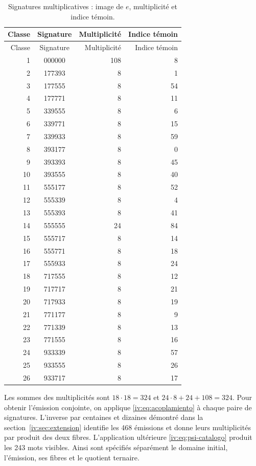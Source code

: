 \begin{longtable}{rcrr}
\caption{Signatures multiplicatives : image de \(e\), multiplicité et indice témoin.}
\label{iv:iv:tabla-firmas-multiplicativas}\\
\toprule
Classe & Signature & Multiplicité & Indice témoin\\
\midrule
\endfirsthead
\toprule
Classe & Signature & Multiplicité & Indice témoin\\
\midrule
\endhead
1&000000&108&8\\
2&177393&8&1\\
3&177555&8&54\\
4&177771&8&11\\
5&339555&8&6\\
6&339771&8&15\\
7&339933&8&59\\
8&393177&8&0\\
9&393393&8&45\\
10&393555&8&40\\
11&555177&8&52\\
12&555339&8&4\\
13&555393&8&41\\
14&555555&24&84\\
15&555717&8&14\\
16&555771&8&18\\
17&555933&8&24\\
18&717555&8&12\\
19&717717&8&21\\
20&717933&8&19\\
21&771177&8&9\\
22&771339&8&13\\
23&771555&8&16\\
24&933339&8&57\\
25&933555&8&26\\
26&933717&8&17\\
\bottomrule
\end{longtable}

Les sommes des multiplicités sont \(18\cdot18=324\) et
\(24\cdot8+24+108=324\). Pour obtenir l’émission conjointe, on applique
\eqref{iv:eq:acoplamiento} à chaque paire de signatures. L’inverse par centaines
et dizaines démontré dans la section~\ref{iv:sec:extension} identifie les 468
émissions et donne leurs multiplicités par produit des deux fibres.
L’application ultérieure \eqref{iv:eq:psi-catalogo} produit les 243
mots visibles. Ainsi sont spécifiés séparément le domaine initial,
l’émission, ses fibres et le quotient ternaire.

